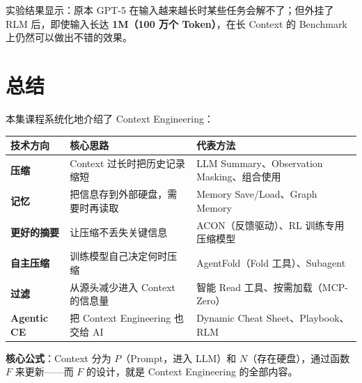 \documentclass[12pt,a4paper]{article}
\begin{document}
实验结果显示：原本 GPT-5 在输入越来越长时某些任务会解不了；但外挂了 RLM 后，即使输入长达 \textbf{1M（100 万个 Token）}，在长 Context 的 Benchmark 上仍然可以做出不错的效果。

\section{总结}

本集课程系统化地介绍了 Context Engineering：

\begin{longtable}{@{} p{} p{} p{} @{}}
\toprule
\textbf{技术方向} & \textbf{核心思路} & \textbf{代表方法} \\
\midrule
\endhead
\textbf{压缩} & Context 过长时把历史记录缩短 & LLM Summary、Observation Masking、组合使用 \\[6pt]
\textbf{记忆} & 把信息存到外部硬盘，需要时再读取 & Memory Save/Load、Graph Memory \\[6pt]
\textbf{更好的摘要} & 让压缩不丢失关键信息 & ACON（反馈驱动）、RL 训练专用压缩模型 \\[6pt]
\textbf{自主压缩} & 训练模型自己决定何时压缩 & AgentFold（Fold 工具）、Subagent \\[6pt]
\textbf{过滤} & 从源头减少进入 Context 的信息量 & 智能 Read 工具、按需加载（MCP-Zero） \\[6pt]
\textbf{Agentic CE} & 把 Context Engineering 也交给 AI & Dynamic Cheat Sheet、Playbook、RLM \\
\bottomrule
\end{longtable}

\begin{myquote}
\textbf{核心公式}：Context 分为 $P$（Prompt，进入 LLM）和 $N$（存在硬盘），通过函数 $F$ 来更新——而 $F$ 的设计，就是 Context Engineering 的全部内容。
\end{myquote}
\end{document}
